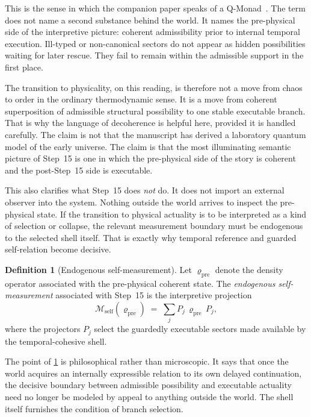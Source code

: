 \documentclass[11pt,a4paper]{article}
\theoremstyle{plain}
\theoremstyle{definition}
\newtheorem{definition}[theorem]{Definition}
\theoremstyle{remark}
\begin{document}
This is the sense in which the companion paper speaks of a Q-Monad~\cite{abb}.
The term does not name a second substance behind the world.
It names the pre-physical side of the interpretive picture: coherent admissibility prior to internal temporal execution.
Ill-typed or non-canonical sectors do not appear as hidden possibilities waiting for later rescue.
They fail to remain within the admissible support in the first place.

The transition to physicality, on this reading, is therefore not a move from chaos to order in the ordinary thermodynamic sense.
It is a move from coherent superposition of admissible structural possibility to one stable executable branch.
That is why the language of decoherence is helpful here, provided it is handled carefully.
The claim is not that the manuscript has derived a laboratory quantum model of the early universe.
The claim is that the most illuminating semantic picture of Step~15 is one in which the pre-physical side of the story is coherent and the post-Step~15 side is executable.

This also clarifies what Step~15 does \emph{not} do.
It does not import an external observer into the system.
Nothing outside the world arrives to inspect the pre-physical state.
If the transition to physical actuality is to be interpreted as a kind of selection or collapse, the relevant measurement boundary must be endogenous to the selected shell itself.
That is exactly why temporal reference and guarded self-relation become decisive.

\begin{definition}[Endogenous self-measurement]
\label{def:self-measurement}
Let $\varrho_{\mathrm{pre}}$ denote the density operator associated with the pre-physical coherent state.
The \emph{endogenous self-measurement} associated with Step~15 is the interpretive projection
\[
    \mathcal{M}_{\mathrm{self}}(\varrho_{\mathrm{pre}})
    \;=\;
    \sum_j P_j\,\varrho_{\mathrm{pre}}\,P_j,
\]
where the projectors $P_j$ select the guardedly executable sectors made available by the temporal-cohesive shell.
\end{definition}

The point of \cref{def:self-measurement} is philosophical rather than microscopic.
It says that once the world acquires an internally expressible relation to its own delayed continuation, the decisive boundary between admissible possibility and executable actuality need no longer be modeled by appeal to anything outside the world.
The shell itself furnishes the condition of branch selection.
\end{document}
